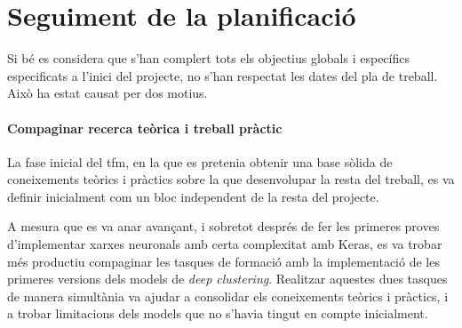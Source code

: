 \documentclass[CAT,BIB]{TFUOC}%
\begin{document}
    \section{Seguiment de la planificació}
    \label{s:seguiment}


        Si bé es considera que s'han complert tots els objectius
        globals i específics
        especificats a l'inici del projecte,
        no s'han respectat les dates del pla de treball.
        Això ha estat causat per dos motius.

        \paragraph{Compaginar recerca teòrica i treball pràctic}
            La fase inicial del \gls{tfm},
            en la que es pretenia obtenir una base sòlida de coneixements
            teòrics i pràctics
            sobre la que desenvolupar la resta del treball,
            es va definir inicialment com un bloc
            independent de la resta del projecte.

            A mesura que es va anar avançant,
            i sobretot després de fer les primeres proves
            d'implementar xarxes neuronals amb certa complexitat amb Keras,
            es va trobar més productiu compaginar
            les tasques de formació
            amb la implementació de les primeres versions
            dels models de \textit{deep clustering}.
            Realitzar aquestes dues tasques
            de manera simultània va ajudar a consolidar els coneixements
            teòrics i pràctics,
            i a trobar limitacions dels models que no s'havia tingut en compte inicialment.
\end{document}
